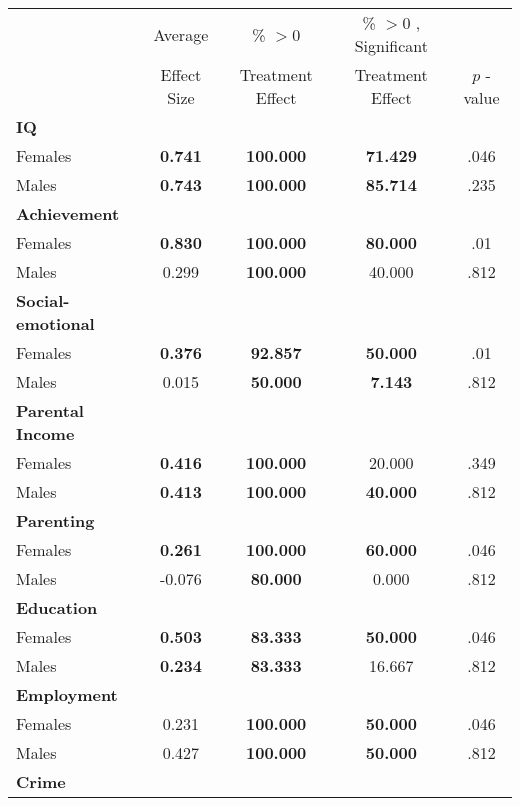 \begin{tabular}{l c c c c}
\toprule
 & Average & \% $ >0 $ & \% $ >0 $ , Significant & \citet{Rosenbaum_2005_Distribution_JRSS} \\
 & Effect Size & Treatment Effect & Treatment Effect & $ p $ -value \\
\midrule
\textbf{IQ} & & & & \\
\quad Females &  \textbf{    0.741} & \textbf{  100.000} & \textbf{   71.429} & .046 \\
\quad Males &  \textbf{    0.743} & \textbf{  100.000} & \textbf{   85.714} & .235 \\
\midrule
\textbf{Achievement} & & & & \\
\quad Females &  \textbf{    0.830} & \textbf{  100.000} & \textbf{   80.000} & .01 \\
\quad Males &      0.299 & \textbf{  100.000} &    40.000 & .812 \\
\midrule
\textbf{Social-emotional} & & & & \\
\quad Females &  \textbf{    0.376} & \textbf{   92.857} & \textbf{   50.000} & .01 \\
\quad Males &      0.015 & \textbf{   50.000} & \textbf{    7.143} & .812 \\
\midrule
\textbf{Parental Income} & & & & \\
\quad Females &  \textbf{    0.416} & \textbf{  100.000} &    20.000 & .349 \\
\quad Males &  \textbf{    0.413} & \textbf{  100.000} & \textbf{   40.000} & .812 \\
\midrule
\textbf{Parenting} & & & & \\
\quad Females &  \textbf{    0.261} & \textbf{  100.000} & \textbf{   60.000} & .046 \\
\quad Males &     -0.076 & \textbf{   80.000} &     0.000 & .812 \\
\midrule
\textbf{Education} & & & & \\
\quad Females &  \textbf{    0.503} & \textbf{   83.333} & \textbf{   50.000} & .046 \\
\quad Males &  \textbf{    0.234} & \textbf{   83.333} &    16.667 & .812 \\
\midrule
\textbf{Employment} & & & & \\
\quad Females &      0.231 & \textbf{  100.000} & \textbf{   50.000} & .046 \\
\quad Males &      0.427 & \textbf{  100.000} & \textbf{   50.000} & .812 \\
\midrule
\textbf{Crime} & & & & \\

\end{tabular}
